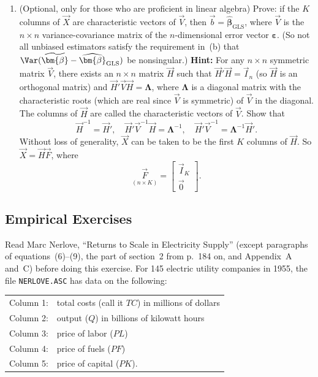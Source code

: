 \begin{problemset}
\begin{enumerate}[label=(\alph*)]
\item (Optional, only for those who are proficient in linear algebra)\quad
Prove: if the $K$ columns of $\vec{X}$ are characteristic vectors of
$\vec{V}$, then $\vec{b} = \widehat{\bm{\beta}}_{\text{GLS}}$, where
$\vec{V}$ is the $n \times n$ variance-covariance matrix of the
$n$-dimensional error vector $\bm{\varepsilon}$.
(So not all unbiased estimators satisfy the requirement in~(b) that
$\Var(\widetilde{\bm{\beta}} - \widehat{\bm{\beta}}_{\text{GLS}})$ be
nonsingular.)
\textbf{Hint:} For any $n \times n$ symmetric matrix $\vec{V}$, there
exists an $n \times n$ matrix $\vec{H}$ such that
$\vec{H}'\vec{H} = \vec{I}_n$ (so $\vec{H}$ is an orthogonal matrix) and
$\vec{H}'\vec{V}\vec{H} = \bm{\Lambda}$, where $\bm{\Lambda}$ is a diagonal
matrix with the characteristic roots (which are real since $\vec{V}$ is
symmetric) of $\vec{V}$ in the diagonal. The columns of $\vec{H}$ are called
the characteristic vectors of $\vec{V}$. Show that
%
\[
\vec{H}^{-1} = \vec{H}', \quad
\vec{H}'\vec{V}^{-1}\vec{H} = \bm{\Lambda}^{-1}, \quad
\vec{H}'\vec{V}^{-1} = \bm{\Lambda}^{-1}\vec{H}'.
\]
%
Without loss of generality, $\vec{X}$ can be taken to be the first $K$
columns of $\vec{H}$. So $\vec{X} = \vec{H}\vec{F}$, where
%
\[
\underset{(n \times K)}{\vec{F}}
= \begin{bmatrix} \vec{I}_K \\ \vec{0} \end{bmatrix}.
\]
\end{enumerate}

\subsection*{Empirical Exercises}

Read Marc Nerlove, ``Returns to Scale in Electricity Supply'' (except
paragraphs of equations~(6)--(9), the part of section~2 from p.~184 on,
and Appendix~A and~C) before doing this exercise. For 145 electric utility
companies in 1955, the file \texttt{NERLOVE.ASC} has data on the following:

\medskip
\noindent
\begin{tabular}{@{}ll}
Column 1: & total costs (call it $TC$) in millions of dollars \\
Column 2: & output ($Q$) in billions of kilowatt hours \\
Column 3: & price of labor ($PL$) \\
Column 4: & price of fuels ($PF$) \\
Column 5: & price of capital ($PK$).
\end{tabular}
\medskip


\end{problemset}
